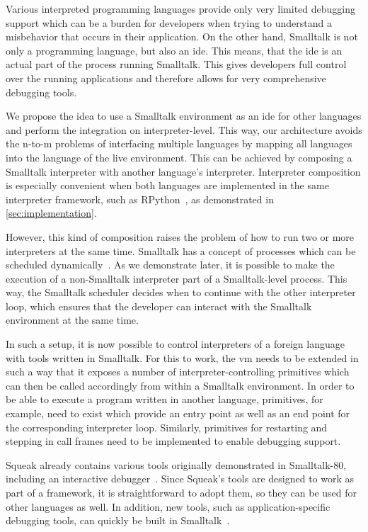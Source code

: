 \documentclass[sigconf,english]{acmart}
\newcommand{\ac}[1]{\gls*{#1}}
\begin{document}
Various interpreted programming languages provide only very limited debugging
support which can be a burden for developers when trying to understand a
misbehavior that occurs in their application.
On the other hand, Smalltalk is not only a programming language, but also an
\ac{ide}. This means, that the \ac{ide} is an actual part of the
process running Smalltalk. This gives developers full control over the running
applications and therefore allows for very comprehensive debugging tools.

We propose the idea to use a Smalltalk environment as an \ac{ide} for other
languages and perform the integration on interpreter-level. This way, our
architecture avoids the n-to-m problems of interfacing multiple languages by
mapping all languages into the language of the live environment. This can be
achieved by composing a Smalltalk interpreter with another language's
interpreter. Interpreter composition is especially convenient when both
languages are implemented in the same interpreter framework, such as
RPython~\cite{Ancona:2007:RST:1297081.1297091}, as demonstrated in
\autoref{sec:implementation}.

However, this kind of composition raises the problem of how to run two or more
interpreters at the same time. Smalltalk has a concept of processes which can be
scheduled dynamically~\cite{Goldberg:1983:SLI:273}. As we demonstrate later, it
is possible to make the execution of a non-Smalltalk interpreter part of a
Smalltalk-level process. This way, the Smalltalk scheduler decides when to
continue with the other interpreter loop, which ensures that the developer can
interact with the Smalltalk environment at the same time.

In such a setup, it is now possible to control interpreters of a foreign
language with tools written in Smalltalk. For this to work, the \ac{vm}
needs to be extended in such a way that it exposes a number of
interpreter-controlling primitives which can then be called accordingly from
within a Smalltalk environment.
In order to be able to execute a program written in another language, primitives,
for example, need to exist which provide an entry point as well as an end point
for the corresponding interpreter loop. Similarly, primitives for restarting and
stepping in call frames need to be implemented to enable debugging support.

Squeak already contains various tools originally demonstrated in Smalltalk-80,
including an interactive
debugger~\cite{goldberg:1984:smalltalk-80:-interactive}. Since Squeak's tools
are designed to work as part of a framework, it is straightforward to adopt
them, so they can be used for other languages as well. In addition,
new tools, such as application-specific debugging tools, can quickly be built in
Smalltalk~\cite{taeumel2012vivide}.
\end{document}
